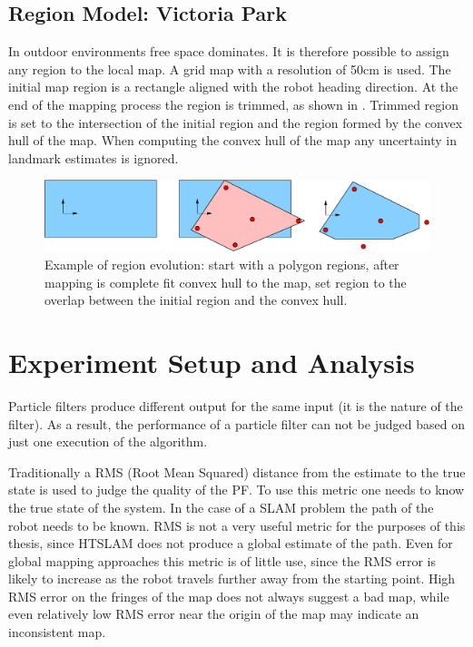 \subsection{Region Model: Victoria Park}

In outdoor environments free space dominates. It is therefore possible
to assign any region to the local map. A grid map with a resolution of
50cm is used. The initial map region is a rectangle aligned with the
robot heading direction. At the end of the mapping process the region
is trimmed, as shown in . Trimmed
region is set to the intersection of the initial region and the region
formed by the convex hull of the map. When computing the convex hull
of the map any uncertainty in landmark estimates is ignored.

\begin{figure}[htbp]
  \centering
  \includegraphics[width=14cm]{Pics/fig_convex_reg}
  \caption[Example of region evolution]
  {Example of region evolution: start with a polygon regions,
  after mapping is complete fit convex hull to the map, set region to
  the overlap between the initial region and the convex hull.}
  \label{fig:initial_region_vision}
\end{figure}

\section{Experiment Setup and Analysis}

Particle filters produce different output for the same input (it is
the nature of the filter). As a result, the performance of a particle
filter can not be judged based on just one execution of the
algorithm. 


Traditionally a RMS (Root Mean Squared) distance from the estimate to
the true state is used to judge the quality of the PF. To use this
metric one needs to know the true state of the system. In the case of
a SLAM problem the path of the robot needs to be known. RMS is not a
very useful metric for the purposes of this thesis, since HTSLAM does
not produce a global estimate of the path. Even for global mapping
approaches this metric is of little use, since the RMS error is likely
to increase as the robot travels further away from the starting point.
High RMS error on the fringes of the map does not always suggest a bad
map, while even relatively low RMS error near the origin of the map
may indicate an inconsistent map.

